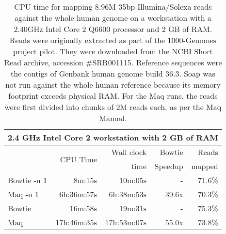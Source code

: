 \documentclass[letterpaper]{article}
\begin{document}
\begin{table}[tp]
\scriptsize
\begin{tabular}{lrrrr}\multicolumn{5}{c}{2.4 GHz Intel Core 2 workstation with 2 GB of RAM}\\
\toprule
 & \multirow{2}{*}{CPU Time} & Wall clock & Bowtie  & Reads  \\
 &                            & time       & Speedup & mapped \\[3pt]
\toprule
Bowtie -n 1 & 8m:15s & 10m:05s & - & 71.6\%\\\midrule
Maq -n 1 & 6h:36m:57s & 6h:38m:53s & 39.6x & 70.3\%\\\midrule
Bowtie & 16m:58s & 19m:31s & - & 75.3\%\\\midrule
Maq & 17h:46m:35s & 17h:53m:07s & 55.0x & 73.8\%\\
\bottomrule
\end{tabular}
\caption{CPU time for mapping 8.96M 35bp Illumina/Solexa reads against the whole human genome on a workstation with a 2.40GHz Intel Core 2 Q6600 processor and 2 GB of RAM. Reads were originally extracted as part of the 1000-Genomes project pilot. They were downloaded from the NCBI Short Read archive, accession \#SRR001115. Reference sequences were the contigs of Genbank human genome build 36.3. Soap was not run against the whole-human reference because its memory footprint exceeds physical RAM. For the Maq runs, the reads were first divided into chunks of 2M reads each, as per the Maq Manual.}
\end{table}
\end{document}
